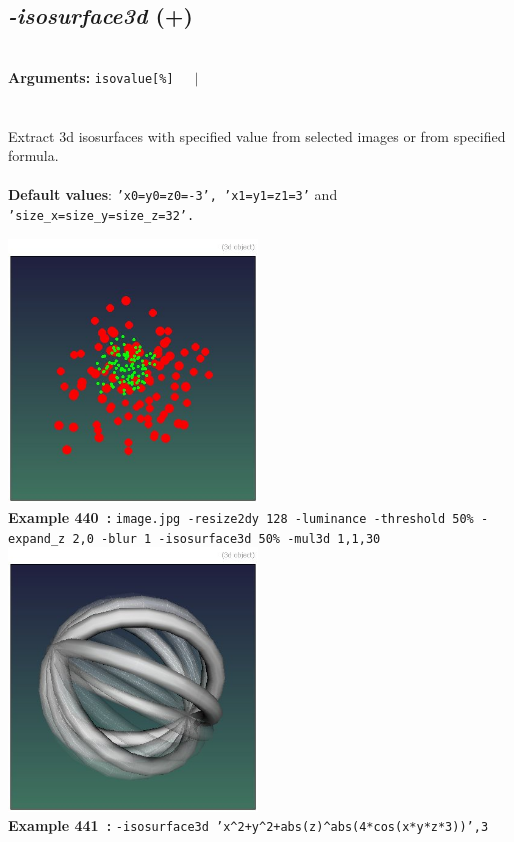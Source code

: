 \documentclass[a4paper,11pt,twoside]{book}
\begin{document}
\subsection{\emph{-isosurface3d} (+)}\vspace*{-0.5em}
~\\\textbf{Arguments: } 
{\small \texttt{isovalue[\%]}}~~~$|$\\
\\~\\
Extract 3d isosurfaces with specified value from selected images or from specified formula.
~\\~\\\textbf{Default values}: {\small \texttt{'x0=y0=z0=-3', 'x1=y1=z1=3'} and \texttt{'size\_x=size\_y=size\_z=32'.}}
\begin{center}\includegraphics[keepaspectratio=true,height=7cm,width=\textwidth]{img/gmic_def440.jpg}\\
{\footnotesize \textbf{Example 440~:} \texttt{image.jpg -resize2dy 128 -luminance -threshold 50\% -expand\_z 2,0 -blur 1 -isosurface3d 50\% -mul3d 1,1,30}}
\\\includegraphics[keepaspectratio=true,height=7cm,width=\textwidth]{img/gmic_def441.jpg}\\
{\footnotesize \textbf{Example 441~:} \texttt{-isosurface3d 'x\textasciicircum 2+y\textasciicircum 2+abs(z)\textasciicircum abs(4*cos(x*y*z*3))',3}}
\end{center}
\end{document}
